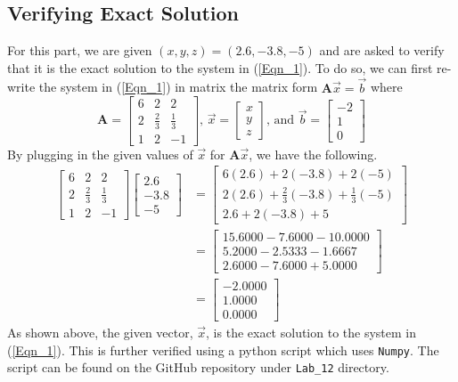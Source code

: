 \documentclass{article}
\begin{document}
\subsection{Verifying Exact Solution}
For this part, we are given \((x,y,z) = (2.6,-3.8,-5)\) and are asked to verify that it is the exact solution to the system in (\ref{Eqn_1}). To do so, we can first re-write the system in (\ref{Eqn_1}) in matrix the matrix form \(\mathbf{A}\Vec{x}=\Vec{b}\) where
\[
\mathbf{A} = \begin{bmatrix}
    6 & 2 & 2 \\
    2 & \frac{2}{3} & \frac{1}{3} \\
    1 & 2 & -1
\end{bmatrix} \mbox{, } \Vec{x} = \begin{bmatrix}
    x \\
    y \\
    z
\end{bmatrix} \mbox{, and } \Vec{b} = \begin{bmatrix}
    -2 \\
    1 \\
    0
\end{bmatrix}
\]
By plugging in the given values of \(\Vec{x}\) for \(\mathbf{A}\Vec{x}\), we have the following.
\[
\begin{split}
    \begin{bmatrix}
    6 & 2 & 2 \\
    2 & \frac{2}{3} & \frac{1}{3} \\
    1 & 2 & -1
\end{bmatrix} \begin{bmatrix}
    2.6 \\
    -3.8 \\
    -5
\end{bmatrix} &= \begin{bmatrix}
    6(2.6)+2(-3.8)+2(-5) \\
    2(2.6)+\frac{2}{3}(-3.8)+\frac{1}{3}(-5) \\
    2.6+2(-3.8)+5
\end{bmatrix} \\
&= \begin{bmatrix}
    15.6000-7.6000-10.0000 \\
    5.2000-2.5333-1.6667 \\
    2.6000-7.6000+5.0000
\end{bmatrix} \\
&= \begin{bmatrix}
    -2.0000 \\
    1.0000 \\
    0.0000
\end{bmatrix}
\end{split}
\]
As shown above, the given vector, \(\Vec{x}\), is the exact solution to the system in (\ref{Eqn_1}). This is further verified using a python script which uses \texttt{Numpy}. The script can be found on the GitHub repository under \texttt{Lab\_12} directory.
\end{document}
